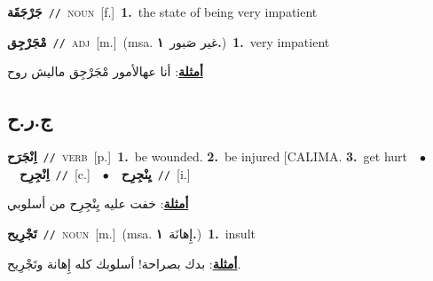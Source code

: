 \documentclass[10pt,a4paper,twoside]{article} %
\begin{document}
\begin{multicols}{2}
{\setlength\topsep{0pt}\textbf{\foreignlanguage{arabic}{جَرْجَقَة}}\ {\color{gray}\texttt{//}\color{black}}\ \textsc{noun}\ [f.]\ \textbf{1.}~the state of being very impatient\ } \vspace{2mm}

{\setlength\topsep{0pt}\textbf{\foreignlanguage{arabic}{مْجَرْجِق}}\ {\color{gray}\texttt{//}\color{black}}\ \textsc{adj}\ [m.]\ \color{gray}(msa. \foreignlanguage{arabic}{غير صَبور}~\foreignlanguage{arabic}{\textbf{١.}})\color{black}\ \textbf{1.}~very impatient\  \begin{flushright}\color{gray}\foreignlanguage{arabic}{\textbf{\underline{\foreignlanguage{arabic}{أمثلة}}}: أنا عهالأمور مْجَرْجِق ماليش روح}\end{flushright}\color{black}} \vspace{2mm}

\vspace{-3mm}
\subsection*{\color{blue}\foreignlanguage{arabic}{ج.ر.ح}\color{blue}{}} 

{\setlength\topsep{0pt}\textbf{\foreignlanguage{arabic}{اِنْجَرَح}}\ {\color{gray}\texttt{//}\color{black}}\ \textsc{verb}\ [p.]\ \textbf{1.}~be wounded.  \textbf{2.}~be injured [CALIMA.  \textbf{3.}~get hurt\ \ $\bullet$\ \ \setlength\topsep{0pt}\textbf{\foreignlanguage{arabic}{اِنْجِرِح}}\ {\color{gray}\texttt{//}\color{black}}\ [c.]\ \ $\bullet$\ \ \setlength\topsep{0pt}\textbf{\foreignlanguage{arabic}{يِنْجِرِح}}\ {\color{gray}\texttt{//}\color{black}}\ [i.]\  \begin{flushright}\color{gray}\foreignlanguage{arabic}{\textbf{\underline{\foreignlanguage{arabic}{أمثلة}}}: خفت عليه يِنْجِرِح من أسلوبي}\end{flushright}\color{black}} \vspace{2mm}

{\setlength\topsep{0pt}\textbf{\foreignlanguage{arabic}{تَجْرِيح}}\ {\color{gray}\texttt{//}\color{black}}\ \textsc{noun}\ [m.]\ \color{gray}(msa. \foreignlanguage{arabic}{إِهانَة}~\foreignlanguage{arabic}{\textbf{١.}})\color{black}\ \textbf{1.}~insult\  \begin{flushright}\color{gray}\foreignlanguage{arabic}{\textbf{\underline{\foreignlanguage{arabic}{أمثلة}}}: بدك بصراحة! أسلوبك كله إِهانة وتَجْرِيح.}\end{flushright}\color{black}} \vspace{2mm}


\end{multicols}
\end{document}
